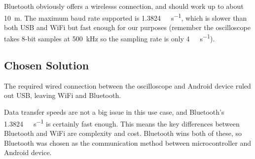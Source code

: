 Bluetooth obviously offers a wirelesss connection, and should work up to about
\SI{10}{\m}. The maximum baud rate supported is
\SI{1.3824}{\mega\bit\per\second}, which is slower than both USB and WiFi but
fast enough for our purposes (remember the oscilloscope takes 8-bit samples at
\SI{500}{\kHz} so the sampling rate is only \SI{4}{\mega\bit\per\second}).

\subsection*{Chosen Solution}
The required wired connection between the oscilloscope and Android device ruled
out USB, leaving WiFi and Bluetooth.

Data transfer speeds are not a big issue in this use case, and Bluetooth's
\SI{1.3824}{\mega\bit\per\second} is certainly fast enough. This means the key
differences between Bluetooth and WiFi are complexity and cost. Bluetooth wins
both of these, so Bluetooth was chosen as the communication method between
microcontroller and Android device.
